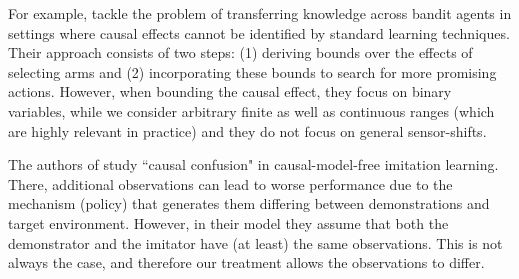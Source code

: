 \documentclass[letterpaper]{article} %
\theoremstyle{definition}%
\theoremstyle{definition}
\newcommand{\todo}[1]{\textcolor{red}{#1}}
\begin{document}
%
For example, \cite{zhang2017transfer} tackle the problem of transferring knowledge across bandit agents in settings where causal effects cannot be identified by standard learning techniques. Their approach consists of two steps: (1) deriving bounds over the effects of selecting arms and (2) incorporating these bounds to search for more promising actions.
However, when bounding the causal effect, they focus on binary variables, while we consider arbitrary finite as well as continuous ranges (which are highly relevant in practice) and they do not focus on general sensor-shifts.

The authors of \cite{causalconfusion} study ``causal confusion" in causal-model-free imitation learning. There, additional observations can lead to worse performance due to the mechanism (policy) that generates them differing between demonstrations and target environment. 
However, in their model they assume that both the demonstrator and the imitator have (at least) the same observations.
This is not always the case, and therefore our treatment allows the observations to differ. 
\end{document}
